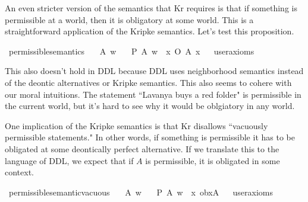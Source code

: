 \begin{isabellebody}
\begin{isamarkuptext}
An even stricter version of the semantics that Kr requires is that if something is permissible at a world, 
then it is obligatory at some world. This is a straightforward application of the Kripke semantics. Let's
test this proposition.%
\end{isamarkuptext}\isamarkuptrue%
\isamarkupfalse%
\ permissible{\isacharunderscore}semantics{\isacharunderscore}{}{\isacharcolon}\isanewline
\ \ \ A\ w\isanewline
\ \ \ {\isachardoublequoteopen}P\ {\isacharbraceleft}A{\isacharbraceright}\ w\ {\isasymlongrightarrow}\ {\isacharparenleft}{\isasymexists}x{\isachardot}\ O\ {\isacharbraceleft}A{\isacharbraceright}\ x{\isacharparenright}{\isachardoublequoteclose}\isanewline
\ \ \isamarkupfalse%
{\isacharbrackleft}user{\isacharunderscore}axioms{\isacharbrackright}%
\isadelimproof
\ %
\endisadelimproof
%
\isatagproof
{}\isamarkupfalse%
\isanewline
%
%
\endisatagproof
{\isafoldproof}%
%
\isadelimproof
%
\endisadelimproof
%
\begin{isamarkuptext}%
This also doesn't hold in DDL because DDL uses neighborhood semantics instead of the deontic 
alternatives or Kripke semantics. This also seems to cohere with our moral intuitions. The statement 
``Lavanya buys a red folder" is permissible in the current world, but it's hard to see why it would 
be oblgiatory in any world.

One implication of the Kripke semantics is that Kr disallows ``vacuously permissible statements." In 
other words, if something is permissible it has to be obligated at some deontically perfect alternative. 
If we translate this to the language of DDL, we expect that if $A$ is permissible, it is obligated in some 
context.%
\end{isamarkuptext}\isamarkuptrue%
\isamarkupfalse%
\ permissible{\isacharunderscore}semantic{\isacharunderscore}vacuous{\isacharcolon}\isanewline
\ \ \ A\ w\isanewline
\ \ \ {\isachardoublequoteopen}P\ {\isacharbraceleft}A{\isacharbraceright}\ w\ {\isasymlongrightarrow}\ {\isacharparenleft}{\isasymexists}x{\isachardot}\ ob{\isacharparenleft}x{\isacharparenright}{\isacharparenleft}A{\isacharparenright}{\isacharparenright}{\isachardoublequoteclose}\isanewline
\ \ \isamarkupfalse%
{\isacharbrackleft}user{\isacharunderscore}axioms{\isacharbrackright}%
\isadelimproof
\ %
\endisadelimproof
%
\isatagproof
{}\isamarkupfalse%
\isanewline
%
\end{isabellebody}
